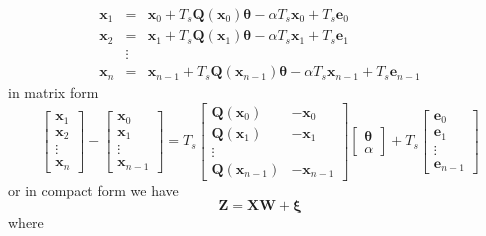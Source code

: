\documentclass[onecolumn,draftcls]{IEEEtran}
\begin{document}
\begin{eqnarray}
 \mathbf x_{1}&=&\mathbf x_{0}+T_s \mathbf Q(\mathbf x_0)\mathbf \theta-\alpha T_s\mathbf x_0+T_s\mathbf e_0 \nonumber \\
 \mathbf x_{2}&=&\mathbf x_{1}+T_s \mathbf Q(\mathbf x_1)\mathbf \theta-\alpha T_s\mathbf x_1+T_s\mathbf e_1\nonumber\\
&\vdots& \nonumber\\
 \mathbf x_{n}&=&\mathbf x_{n-1}+T_s \mathbf Q(\mathbf x_{n-1})\mathbf \theta-\alpha T_s\mathbf x_{n-1}+T_s\mathbf e_{n-1}
\end{eqnarray}
in matrix form
\begin{equation}
 \begin{bmatrix} \mathbf x_{1}\\\mathbf x_{2}\\\vdots\\\mathbf x_{n}\end{bmatrix}-\begin{bmatrix} \mathbf x_{0}\\\mathbf x_{1}\\\vdots\\\mathbf x_{n-1}\end{bmatrix}=T_s\begin{bmatrix}\mathbf Q(\mathbf x_0)&-\mathbf x_{0}\\\mathbf Q(\mathbf x_1)&-\mathbf x_{1}\\\vdots\\ \mathbf Q(\mathbf x_{n-1})&-\mathbf x_{n-1}\end{bmatrix}\begin{bmatrix}\mathbf \theta \\ \alpha\end{bmatrix}+T_s\begin{bmatrix}\mathbf e_0\\\mathbf e_1\\\vdots\\\mathbf e_{n-1}\end{bmatrix}
\end{equation}
or in compact form we have
\begin{equation}
 \mathbf Z=\mathbf X \mathbf W+\boldsymbol \xi
\end{equation}
where
\end{document}
